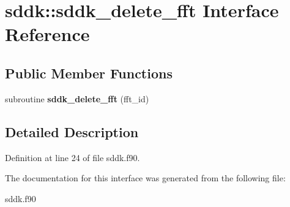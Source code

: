 \hypertarget{interfacesddk_1_1sddk__delete__fft}{}\section{sddk\+:\+:sddk\+\_\+delete\+\_\+fft Interface Reference}
\label{interfacesddk_1_1sddk__delete__fft}
\subsection*{Public Member Functions}
\begin{DoxyCompactItemize}
\item 
\hypertarget{interfacesddk_1_1sddk__delete__fft_aac4a316490034110750857707eb78364}{}subroutine {\bfseries sddk\+\_\+delete\+\_\+fft} (fft\+\_\+id)\label{interfacesddk_1_1sddk__delete__fft_aac4a316490034110750857707eb78364}

\end{DoxyCompactItemize}


\subsection{Detailed Description}


Definition at line 24 of file sddk.\+f90.



The documentation for this interface was generated from the following file\+:\begin{DoxyCompactItemize}
\item 
sddk.\+f90\end{DoxyCompactItemize}
